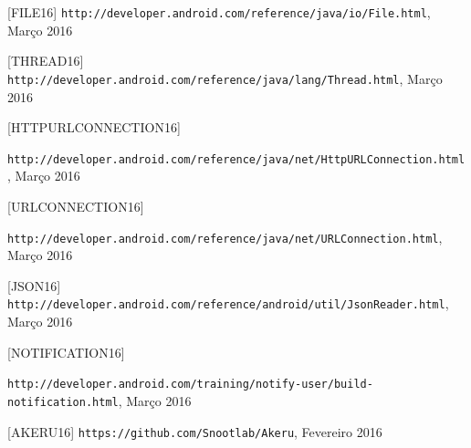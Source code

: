 \documentclass[a4paper]{article}
\begin{document}
\begin{thebibliography}{9}

  [FILE16] \texttt{http://developer.android.com/reference/java/io/File.html}, Março 2016
  
  [THREAD16] \texttt{http://developer.android.com/reference/java/lang/Thread.html}, Março 2016
  
  [HTTPURLCONNECTION16] \begin{sloppypar} \texttt{http://developer.android.com/reference/java/net/HttpURLConnection.html}, Março 2016 \end{sloppypar}
  
  [URLCONNECTION16] \begin{sloppypar}\texttt{http://developer.android.com/reference/java/net/URLConnection.html}, Março 2016 \end{sloppypar}
  
  [JSON16] \texttt{http://developer.android.com/reference/android/util/JsonReader.html}, Março 2016
  
  [NOTIFICATION16] \begin{sloppypar}\texttt{http://developer.android.com/training/notify-user/build-notification.html}, Março 2016 \end{sloppypar}
  
  [AKERU16] \texttt{https://github.com/Snootlab/Akeru}, Fevereiro 2016


\end{thebibliography}
\end{document}
